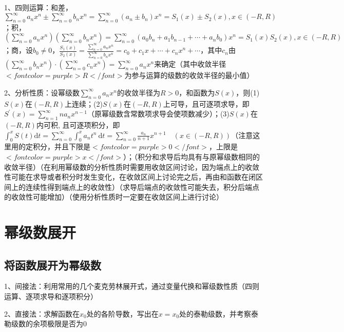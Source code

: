 1、四则运算：和差，$ \sum_{n=0}^{\infty} a_{n} x^{n} \pm \sum_{n=0}^{\infty} b_{n} x^{n}=\sum_{n=0}^{\infty}\left(a_{n} \pm b_{n}\right) x^{n}=S_{1}(x) \pm S_{2}(x), x \in(-R, R) $；积，$ \left(\sum_{n=0}^{\infty} a_{n} x^{n}\right)\left(\sum_{n=0}^{\infty} b_{n} x^{n}\right)=\sum_{n=0}^{\infty}\left(a_{0} b_{n}+a_{1} b_{n-1}+\cdots+a_{n} b_{0}\right) x^{n}=S_{1}(x) S_{2}(x), x \in(-R, R)  $；商，设$ b_0 \ne 0 $，$ \frac{S_{1}(x)}{S_{2}(x)}=\frac{\sum_{n=0}^{\infty} a_{n} x^{n}}{\sum_{n=0}^{\infty} b_{n} x^{n}}=c_{0}+c_{1} x+\cdots+c_{n} x^{n}+\cdots $，其中$ c_{n} $由$ \left(\sum_{n=0}^{\infty} b_{n} x^{n}\right) \cdot\left(\sum_{n=0}^{\infty} c_{n} x^{n}\right)=\sum_{n=0}^{\infty} a_{n} x^{n} $来确定（其中收敛半径$ <font color=purple>R</font> $为参与运算的级数的收敛半径的最小值）

2、分析性质：设幂级数$ \sum_{n=0}^{\infty} a_{n} x^{n} $的收敛半径为$ R>0 $，和函数为$ S(x) $，则(1)$ S(x) $在$ (-R, R) $上连续；(2)$ S(x) $在$ (-R, R) $上可导，且可逐项求导，即$ S^{\prime}(x)=\sum_{n=1}^{\infty} n a_{n} x^{n-1} $（原幂级数含常数项求导会使项数减少）；(3)$ S(x) $在$ (-R, R) $内可积, 且可逐项积分，即$ \int_{0}^{x} S(t) \mathrm{d} t=\sum_{n=0}^{\infty} \int_{0}^{x} a_{n} t^{n} \mathrm{~d} t=\sum_{n=0}^{\infty} \frac{a_{n}}{n+1} x^{n+1} \quad(x \in(-R, R)) $（注意这里用的定积分，并且下限是$ <font color=purple>0</font> $，上限是$ <font color=purple>x</font> $）；（积分和求导后均具有与原幂级数相同的收敛半径）（在利用幂级数的分析性质时需要用收敛区间讨论，因为端点上的收敛性可能在求导或者积分时发生变化，在收敛区间上讨论完之后，再由和函数在闭区间上的连续性得到端点上的收敛性）（求导后端点的收敛性可能失去，积分后端点的收敛性可能增加）（使用分析性质时一定要在收敛区间上进行讨论）

\section{幂级数展开}



\subsection{将函数展开为幂级数}

1、间接法：利用常用的几个麦克劳林展开式，通过变量代换和幂级数性质（四则运算、逐项求导和逐项积分）

2、直接法：求解函数在$ x_0 $处的各阶导数，写出在$ x=x_0 $处的泰勒级数，并考察泰勒级数的余项极限是否为0

